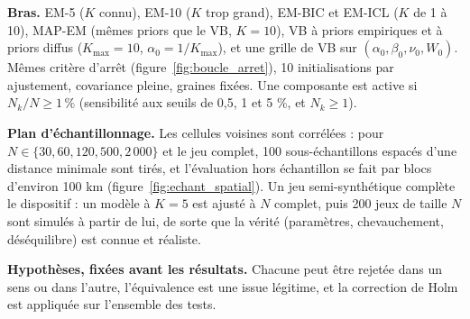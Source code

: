 \textbf{Bras. }EM-5 ($K$ connu), EM-10 ($K$ trop grand), EM-BIC et EM-ICL ($K$ de 1 à 10), MAP-EM (mêmes priors que le VB, $K=10$), VB à priors empiriques et à priors diffus ($K_{\max}=10$, $\alpha_0 = 1/K_{\max}$), et une grille de VB sur $(\alpha_0, \beta_0, \nu_0, W_0)$. Mêmes critère d'arrêt (figure~\ref{fig:boucle_arret}), 10 initialisations par ajustement, covariance pleine, graines fixées. Une composante est active si $N_k/N \geq 1\,\%$ (sensibilité aux seuils de 0,5, 1 et 5 \%, et $N_k \geq 1$).

\textbf{Plan d'échantillonnage. }Les cellules voisines sont corrélées : pour $N \in \{30, 60, 120, 500, 2\,000\}$ et le jeu complet, 100 sous-échantillons espacés d'une distance minimale sont tirés, et l'évaluation hors échantillon se fait par blocs d'environ 100 km (figure~\ref{fig:echant_spatial}). Un jeu semi-synthétique complète le dispositif : un modèle à $K=5$ est ajusté à $N$ complet, puis 200 jeux de taille $N$ sont simulés à partir de lui, de sorte que la vérité (paramètres, chevauchement, déséquilibre) est connue et réaliste.



\textbf{Hypothèses, fixées avant les résultats. }Chacune peut être rejetée dans un sens ou dans l'autre, l'équivalence est une issue légitime, et la correction de Holm est appliquée sur l'ensemble des tests.


